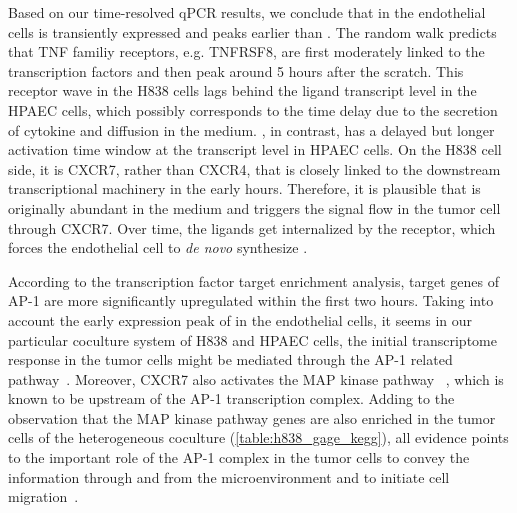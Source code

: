 Based on our time-resolved qPCR results, we conclude that \tnfa in the endothelial 
cells is 
transiently expressed and peaks earlier than \sdfonea.
The random walk predicts that TNF familiy receptors, e.g.
TNFRSF8, are first moderately linked to
the transcription factors and then peak around 5 hours after the scratch. This receptor
wave in the H838 cells lags behind the ligand transcript level in the HPAEC cells,
which possibly corresponds to the time delay due to the 
secretion of cytokine and diffusion in the medium.
\sdfonea, in contrast, has
a delayed but longer activation time window at the 
transcript level in HPAEC cells. 
On the H838 cell side, it is CXCR7, rather than CXCR4, that
is closely linked to the downstream transcriptional machinery
in the early hours. Therefore, it is plausible that \sdfonea
is originally abundant in the medium and triggers the 
signal flow in the tumor cell through CXCR7. 
Over time, the ligands get
internalized by the receptor, 
which forces the endothelial cell to 
\emph{de novo} synthesize \sdfonea. 


According to the transcription factor target enrichment analysis, target genes
of AP-1 are more significantly upregulated within the first two hours. 
Taking into account
the early expression peak of \tnfa in the endothelial cells, it seems
in our particular coculture system of H838 and HPAEC cells, the initial 
transcriptome response in the tumor cells might be mediated through the AP-1
related pathway~\citep{Kulbe2005}. 
Moreover, CXCR7 also activates the MAP kinase pathway%
~\citep{Rajagopal2010a},
which is 
known to be upstream of the AP-1 transcription complex.
Adding to the observation that the MAP kinase pathway genes are also enriched 
in the tumor cells of the heterogeneous coculture 
(\ref{table:h838_gage_kegg}), 
all evidence points to the important role of the
AP-1 complex in the tumor cells to convey the information 
through \tnfa and \sdfonea from the microenvironment and to initiate cell
migration~\citep{Busch2008,Singh2012}.

